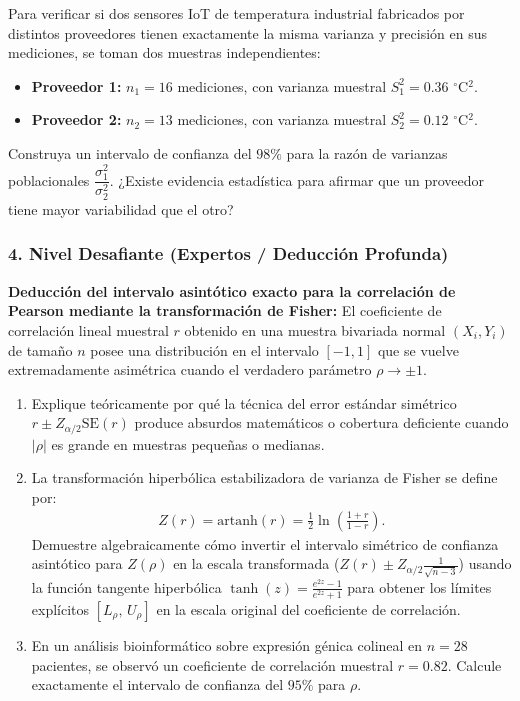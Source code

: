 \begin{problema}
	\label{prob:ic_razon_varianzas}
	Para verificar si dos sensores IoT de temperatura industrial fabricados por distintos proveedores tienen exactamente la misma varianza y precisión en sus mediciones, se toman dos muestras independientes:
	\begin{itemize}
		\item \textbf{Proveedor 1:} $n_1 = 16$ mediciones, con varianza muestral $S_1^2 = 0.36$ $^\circ$C$^2$.
		\item \textbf{Proveedor 2:} $n_2 = 13$ mediciones, con varianza muestral $S_2^2 = 0.12$ $^\circ$C$^2$.
	\end{itemize}
	Construya un intervalo de confianza del $98\%$ para la razón de varianzas poblacionales $\dfrac{\sigma_1^2}{\sigma_2^2}$. ¿Existe evidencia estadística para afirmar que un proveedor tiene mayor variabilidad que el otro?
\end{problema}

\subsubsection*{4. Nivel Desafiante (Expertos / Deducción Profunda)}

\begin{problema}
	\label{prob:ic-desaf-fisher}
	\textbf{Deducción del intervalo asintótico exacto para la correlación de Pearson mediante la transformación de Fisher:}
	El coeficiente de correlación lineal muestral $r$ obtenido en una muestra bivariada normal $(X_i, Y_i)$ de tamaño $n$ posee una distribución en el intervalo $[-1, 1]$ que se vuelve extremadamente asimétrica cuando el verdadero parámetro $\rho \to \pm 1$.
	\begin{enumerate}
		\item Explique teóricamente por qué la técnica del error estándar simétrico $r \pm Z_{\alpha/2}\text{SE}(r)$ produce absurdos matemáticos o cobertura deficiente cuando $|\rho|$ es grande en muestras pequeñas o medianas.
		\item La transformación hiperbólica estabilizadora de varianza de Fisher se define por:
		\begin{align}
			Z(r) = \text{artanh}(r) = \frac{1}{2} \ln\left( \frac{1 + r}{1 - r} \right).
		\end{align}
		Demuestre algebraicamente cómo invertir el intervalo simétrico de confianza asintótico para $Z(\rho)$ en la escala transformada ($Z(r) \pm Z_{\alpha/2}\frac{1}{\sqrt{n-3}}$) usando la función tangente hiperbólica $\tanh(z) = \frac{e^{2z}-1}{e^{2z}+1}$ para obtener los límites explícitos $[L_\rho, \, U_\rho]$ en la escala original del coeficiente de correlación.
		\item En un análisis bioinformático sobre expresión génica colineal en $n = 28$ pacientes, se observó un coeficiente de correlación muestral $r = 0.82$. Calcule exactamente el intervalo de confianza del $95\%$ para $\rho$.
	\end{enumerate}
\end{problema}

